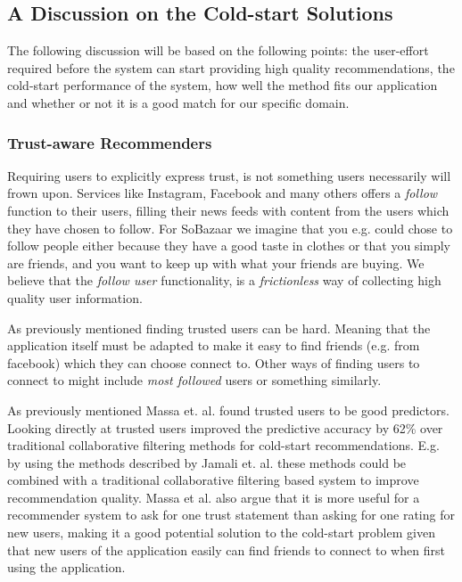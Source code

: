 \subsection{A Discussion on the Cold-start Solutions}
\label{sec:cold-start-discussion}

The following discussion will be based on the following points: the user-effort
required before the system can start providing high quality recommendations, the
cold-start performance of the system, how well the method fits our application
and whether or not it is a good match for our specific domain.

\subsubsection{Trust-aware Recommenders}

Requiring users to explicitly express trust, is not something users necessarily
will frown upon. Services like Instagram, Facebook and many others offers a
\emph{follow} function to their users, filling their news feeds with content from
the users which they have chosen to follow. For SoBazaar we imagine that you
e.g. could chose to follow people either because they have a good taste in
clothes or that you simply are friends, and you want to keep up with what your
friends are buying. We believe that the \emph{follow user} functionality, is
a \emph{frictionless} way of collecting high quality user information.

As previously mentioned finding trusted users can be hard. Meaning that the
application itself must be adapted to make it easy to find friends (e.g. from facebook)
which they can choose connect to. Other ways of finding users to connect to might
include \emph{most followed} users or something similarly.

As previously mentioned Massa et. al. \cite{Massa2007} found trusted users
to be good predictors. Looking directly at trusted users improved the
predictive accuracy by 62\% over traditional collaborative filtering methods
for cold-start recommendations. E.g. by using the methods described by
Jamali et. al. \cite{Jamali2009} these methods could be combined with a traditional collaborative
filtering based system to improve recommendation quality. Massa et al. \cite{Massa2004} also argue that it is more
useful for a recommender system to ask for one trust statement than asking for
one rating for new users, making it a good potential solution to the cold-start
problem given that new users of the application easily can find friends
to connect to when first using the application.

